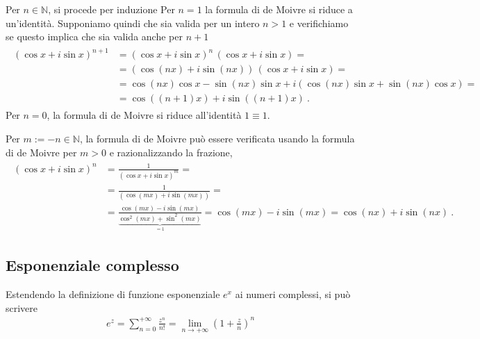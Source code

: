 \documentclass[letterpaper,10pt,italian]{jupyterBook}
\begin{document}
\sphinxAtStartPar
Per \(n \in \mathbb{N}\), si procede per induzione   Per \(n = 1\) la formula di de Moivre si riduce a un’identità. Supponiamo quindi che sia valida per un intero \(n > 1\) e verifichiamo se questo implica che sia valida anche per \(n+1\)
\begin{equation*}
\begin{split}\begin{aligned}
  (\cos x + i \sin x)^{n+1} & = (\cos x + i \sin x)^n \, (\cos x + i \sin x) = \\
                            & = \left(\cos (nx)+ i \sin (nx) \right) \, (\cos x + i \sin x) = \\
                            & = \cos(nx) \cos x - \sin(nx) \sin x + i \left( \cos(nx) \sin x + \sin(nx) \cos x \right) = \\
                            & = \cos( (n+1)x ) + i \sin( (n+1) x ) \ .
\end{aligned}\end{split}
\end{equation*}
\sphinxAtStartPar
Per \(n = 0\), la formula di de Moivre si riduce all’identità \(1 \equiv 1\).

\sphinxAtStartPar
Per \(m := -n \in \mathbb{N}\), la formula di de Moivre può essere verificata usando la formula di de Moivre per \(m > 0\) e razionalizzando la frazione,
\begin{equation*}
\begin{split}\begin{aligned}
  \left( \cos x + i \sin x \right)^{n} & = \frac{1}{\left( \cos x + i \sin x \right)^m} = \\
   & = \frac{1}{\left( \cos (m x) + i \sin (m x) \right)} = \\
   & = \frac{\cos( m x) - i \sin (m x)}{\underbrace{\cos^2(mx) + \sin^2(mx)}_{=1}} = \cos(mx) - i \sin(mx) = \cos(nx) + i \sin(nx) \ .
\end{aligned}\end{split}
\end{equation*}

\subsection{Esponenziale complesso}
\label{\detokenize{ch/algebra/complex-algebra-notes:esponenziale-complesso}}\label{\detokenize{ch/algebra/complex-algebra-notes:math-hs-algebra-complex-notes-complex-exp}}
\sphinxAtStartPar
Estendendo la definizione di funzione esponenziale \(e^x\) ai numeri complessi, si può scrivere
\begin{equation}\label{equation:ch/algebra/complex-algebra-notes:complex:complex-exp:notes}
\begin{split}e^z = \sum_{n = 0}^{+\infty} \frac{z^n}{n!} = \lim_{n \rightarrow +\infty} \left( 1 + \frac{z}{n} \right)^n\end{split}
\end{equation}
\end{document}
